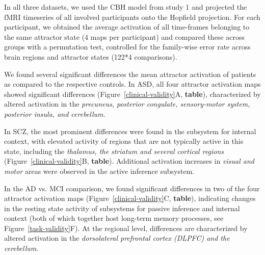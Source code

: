 \documentclass{article}
\begin{document}
In all three datasets, we used the CBH model from study 1 and projected the fMRI timeseries of all involved participants onto the Hopfield projection. For each participant, we obtained the average activation of all time-frames belonging to the same attractor state (4 maps per participant) and compared these across groups with a permutation test, controlled for the family-wise error rate across brain regions and attractor states (122*4 comparisons).

We found several significant differences the mean attractor activation of patients as compared to the respective controls. In ASD, all four attractor activation maps showed significant differences (Figure~\ref{clinical-validity}A, \textbf{table}), characterized by altered activation in the \textit{precuneus, posterior congulate, sensory-motor system, posterior insula, and cerebellum}.

In SCZ, the most prominent differences were found in the subsystem for internal context, with elevated activity of regions that are not typically active in this state, including the \textit{thalamus, the striatum and several cortical regions} (Figure~\ref{clinical-validity}B, \textbf{table}). Additional activation increases in \textit{visual and motor} areas were observed in the active inference subsystem.

In the AD vs. MCI comparison, we found significant differences in two of the four attractor activation maps (Figure~\ref{clinical-validity}C, \textbf{table}), indicating changes in the resting state activity of subsystems for passive inference and internal context (both of which together host long-term memory processes, see Figure~\ref{task-validity}F). At the regional level, differences are characterized by altered activation in the \textit{dorsolateral prefrontal cortex (DLPFC) and the cerebellum}.
\end{document}
